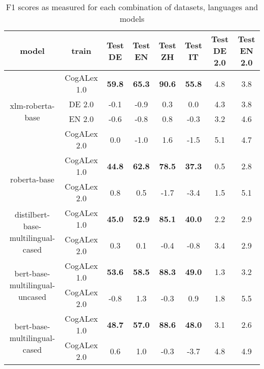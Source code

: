 \begin{table*}[!ht]
\centering
\begin{adjustbox}{width=1\textwidth,center=\textwidth}
\small
\begin{tabular}{c|c|cccc|cc}
{\textbf{model}} & {\textbf{train}} & {\textbf{Test DE}} & {\textbf{Test EN}} & {\textbf{Test ZH}} & {\textbf{Test IT}} & {\textbf{Test DE 2.0}} & {\textbf{Test EN 2.0}} \\ \hline
\multirow[c]{4}{*}{xlm-roberta-base} &  CogALex 1.0 & \bfseries 59.8 & \bfseries 65.3 & \bfseries 90.6 & \bfseries 55.8 & \color{OliveGreen} 4.8 & \color{OliveGreen} 3.8 \\
 &  DE 2.0 & \color{red} -0.1 & \color{red} -0.9 & \color{OliveGreen} 0.3 & 0.0 & \color{OliveGreen} 4.3 & \color{OliveGreen} 3.8 \\
 &  EN 2.0 & \color{red} -0.6 & \color{red} -0.8 & \color{OliveGreen} 0.8 & \color{red} -0.3 & \color{OliveGreen} 3.2 & \color{OliveGreen} 4.6 \\
 & CogALex 2.0 & 0.0 & \color{red} -1.0 & \color{OliveGreen} 1.6 & \color{red} -1.5 & \color{OliveGreen} 5.1 & \color{OliveGreen} 4.7 \\
\hline
\multirow[c]{2}{*}{roberta-base} &  CogALex 1.0 & \bfseries 44.8 & \bfseries 62.8 & \bfseries 78.5 & \bfseries 37.3 & \color{OliveGreen} 0.5 & \color{OliveGreen} 2.8 \\
 & CogALex 2.0 & \color{OliveGreen} 0.8 & \color{OliveGreen} 0.5 & \color{red} -1.7 & \color{red} -3.4 & \color{OliveGreen} 1.5 & \color{OliveGreen} 5.1 \\
\hline
\multirow[c]{2}{*}{distilbert-base-multilingual-cased} &  CogALex 1.0 & \bfseries 45.0 & \bfseries 52.9 & \bfseries 85.1 & \bfseries 40.0 & \color{OliveGreen} 2.2 & \color{OliveGreen} 2.9 \\
 & CogALex 2.0 & \color{OliveGreen} 0.3 & \color{OliveGreen} 0.1 & \color{red} -0.4 & \color{red} -0.8 & \color{OliveGreen} 3.4 & \color{OliveGreen} 2.9 \\
\hline
\multirow[c]{2}{*}{bert-base-multilingual-uncased} &  CogALex 1.0 & \bfseries 53.6 & \bfseries 58.5 & \bfseries 88.3 & \bfseries 49.0 & \color{OliveGreen} 1.3 & \color{OliveGreen} 3.2 \\
 & CogALex 2.0 & \color{red} -0.8 & \color{OliveGreen} 1.3 & \color{red} -0.3 & \color{OliveGreen} 0.9 & \color{OliveGreen} 1.8 & \color{OliveGreen} 5.5 \\
\hline
\multirow[c]{2}{*}{bert-base-multilingual-cased} &  CogALex 1.0 & \bfseries 48.7 & \bfseries 57.0 & \bfseries 88.6 & \bfseries 48.0 & \color{OliveGreen} 3.1 & \color{OliveGreen} 2.6 \\
 & CogALex 2.0 & \color{OliveGreen} 0.6 & \color{OliveGreen} 1.0 & \color{red} -0.3 & \color{red} -3.7 & \color{OliveGreen} 4.8 & \color{OliveGreen} 4.9 \\
\end{tabular}
\end{adjustbox}
\caption{F1 scores as measured for each combination of datasets, languages and models}
\label{tab:colored_results}
\end{table*}
